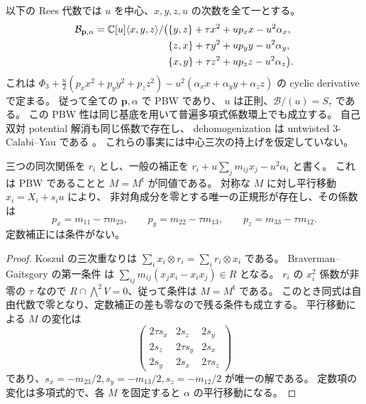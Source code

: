 以下の Rees 代数では $u$ を中心、$x,y,z,u$ の次数を全て一とする。
\begin{equation}\label{eco:eq:clifford-rees}
 \begin{split}
 \mathcal B_{\mathbf p,\alpha}
 =\mathbb C[u]\langle x,y,z\rangle/\bigl(&
 \{y,z\}+\tau x^2+up_xx-u^2\alpha_x,\\
 &\{z,x\}+\tau y^2+up_yy-u^2\alpha_y,\\
 &\{x,y\}+\tau z^2+up_zz-u^2\alpha_z\bigr).
 \end{split}
\end{equation}
これは $\Phi_3+\frac u2(p_xx^2+p_yy^2+p_zz^2)
-u^2(\alpha_xx+\alpha_yy+\alpha_zz)$ の cyclic derivative で定まる。
従って全ての $\mathbf p,\alpha$ で PBW であり、
$u$ は正則、$\mathcal B/(u)=S_\tau$ である。
この PBW 性は同じ基底を用いて普遍多項式係数環上でも成立する。
自己双対 potential 解消も同じ係数で存在し、
dehomogenization は untwisted $3$-Calabi--Yau である
\cite[Theorems~3.1, 3.6]{NFMBeTa}。
これらの事実には中心三次の持上げを仮定していない。

\begin{proposition}
\label{eco:prop:clifford-pbw}
三つの同次関係を $r_i$ とし、一般の補正を
$r_i+u\sum_jm_{ij}x_j-u^2\alpha_i$ と書く。
これは PBW であることと $M=M^{\mathsf t}$ が同値である。
対称な $M$ に対し平行移動 $x_i=X_i+s_i u$ により、
非対角成分を零とする唯一の正規形が存在し、その係数は
\begin{equation}\label{eco:eq:normal-parameters}
 p_x=m_{11}-\tau m_{23},\qquad
 p_y=m_{22}-\tau m_{13},\qquad
 p_z=m_{33}-\tau m_{12}.
\end{equation}
定数補正には条件がない。
\end{proposition}

\begin{proof}
Koszul の三次重なりは $\sum_i x_i\otimes r_i=\sum_i r_i\otimes x_i$ である。
Braverman--Gaitsgory の第一条件
\cite[Main Theorem~0.5, Lemma~3.3]{CMOBravermanGaitsgory}は
$\sum_{ij}m_{ij}(x_jx_i-x_ix_j)\in R$ となる。
$r_i$ の $x_i^2$ 係数が非零の $\tau$ なので
$R\cap\bigwedge^2V=0$、従って条件は $M=M^{\mathsf t}$ である。
このとき同式は自由代数で零となり、定数補正の差も零なので残る条件も成立する。
平行移動による $M$ の変化は
\[
 \begin{pmatrix}
 2\tau s_x&2s_z&2s_y\\
 2s_z&2\tau s_y&2s_x\\
 2s_y&2s_x&2\tau s_z
 \end{pmatrix}
\]
であり、$s_x=-m_{23}/2,s_y=-m_{13}/2,s_z=-m_{12}/2$ が唯一の解である。
定数項の変化は多項式的で、各 $M$ を固定すると $\alpha$ の平行移動になる。
\end{proof}

